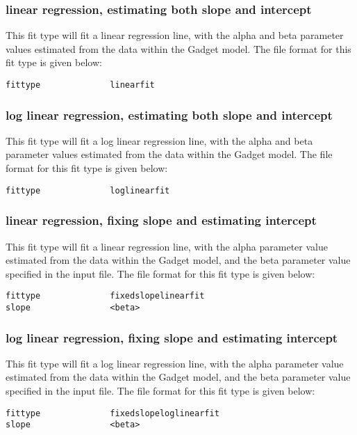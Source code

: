 \documentclass [a4paper, 10pt]{book}
\begin{document}
\subsubsection{linear regression, estimating both slope and intercept}
This fit type will fit a linear regression line, with the alpha and beta parameter values estimated from the data within the Gadget model.  The file format for this fit type is given below:
{\small\begin{verbatim}
fittype              linearfit
\end{verbatim}}

\subsubsection{log linear regression, estimating both slope and intercept}
This fit type will fit a log linear regression line, with the alpha and beta parameter values estimated from the data within the Gadget model.  The file format for this fit type is given below:

{\small\begin{verbatim}
fittype              loglinearfit
\end{verbatim}}

\subsubsection{linear regression, fixing slope and estimating intercept}
This fit type will fit a linear regression line, with the alpha parameter value estimated from the data within the Gadget model, and the beta parameter value specified in the input file.  The file format for this fit type is given below:

{\small\begin{verbatim}
fittype              fixedslopelinearfit
slope                <beta>
\end{verbatim}}

\subsubsection{log linear regression, fixing slope and estimating intercept}
This fit type will fit a log linear regression line, with the alpha parameter value estimated from the data within the Gadget model, and the beta parameter value specified in the input file.  The file format for this fit type is given below:

{\small\begin{verbatim}
fittype              fixedslopeloglinearfit
slope                <beta>
\end{verbatim}}
\end{document}
